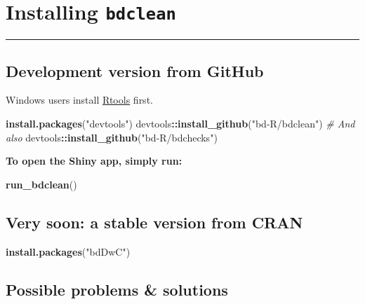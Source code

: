 \documentclass[]{book}
\newenvironment{Shaded}{\begin{snugshade}}{\end{snugshade}}
\newcommand{\KeywordTok}[1]{\textcolor[rgb]{0.13,0.29,0.53}{\textbf{#1}}}
\newcommand{\StringTok}[1]{\textcolor[rgb]{0.31,0.60,0.02}{#1}}
\newcommand{\CommentTok}[1]{\textcolor[rgb]{0.56,0.35,0.01}{\textit{#1}}}
\newcommand{\OperatorTok}[1]{\textcolor[rgb]{0.81,0.36,0.00}{\textbf{#1}}}
\newcommand{\NormalTok}[1]{#1}
\begin{document}
\chapter{\texorpdfstring{Installing
\texttt{bdclean}}{Installing bdclean}}\label{installing-bdclean}

\begin{center}\rule{0.5\linewidth}{\linethickness}\end{center}

\section{Development version from
GitHub}\label{development-version-from-github}

Windows users install
\href{https://cran.r-project.org/bin/windows/Rtools/}{Rtools} first.

\begin{Shaded}
\begin{Highlighting}[]
\KeywordTok{install.packages}\NormalTok{(}\StringTok{"devtools"}\NormalTok{)}
\NormalTok{devtools}\OperatorTok{::}\KeywordTok{install_github}\NormalTok{(}\StringTok{"bd-R/bdclean"}\NormalTok{)}
\CommentTok{# And also}
\NormalTok{devtools}\OperatorTok{::}\KeywordTok{install_github}\NormalTok{(}\StringTok{"bd-R/bdchecks"}\NormalTok{)}
\end{Highlighting}
\end{Shaded}

\textbf{To open the Shiny app, simply run:}

\begin{Shaded}
\begin{Highlighting}[]
\KeywordTok{run_bdclean}\NormalTok{()}
\end{Highlighting}
\end{Shaded}

\section{\texorpdfstring{{Very soon: a stable version from
CRAN}}{Very soon: a stable version from CRAN}}\label{very-soon-a-stable-version-from-cran}

\begin{Shaded}
\begin{Highlighting}[]
\KeywordTok{install.packages}\NormalTok{(}\StringTok{"bdDwC"}\NormalTok{)}
\end{Highlighting}
\end{Shaded}

\section{Possible problems \&
solutions}\label{possible-problems-solutions}
\end{document}
